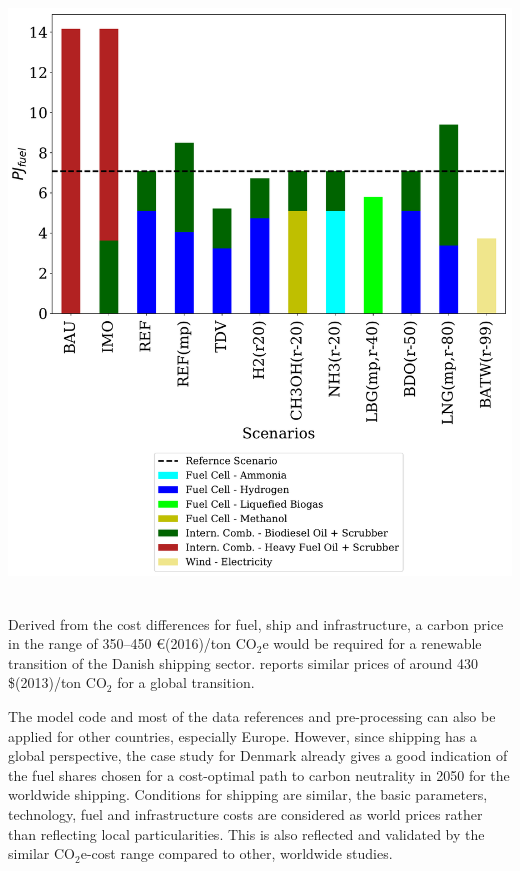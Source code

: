 \documentclass[article]{elsarticle}
\begin{document}
\begin{minipage}[t]{0.49\textwidth}
    \centering
    \captionsetup{justification=centering}
    \includegraphics[width=.95\textwidth]{figures/AllFuel2050.pdf}
    \label{fig:AllFuel2050}
\end{minipage}\\[0.75cm]



Derived from the cost differences for fuel, ship and infrastructure, a carbon price in the range of 350--450 \euro(2016)/ton CO$_2$e would be required for a renewable transition of the Danish shipping sector. \citep[p.197]{Raucci2017} reports similar prices of around 430 \$(2013)/ton CO$_2$ for a global transition.

The model code and most of the data references and pre-processing can also be applied for other countries, especially Europe. However, since shipping has a global perspective, the case study for Denmark already gives a good indication of the fuel shares chosen for a cost-optimal path to carbon neutrality in 2050 for the worldwide shipping. Conditions for shipping are similar, the basic parameters, technology, fuel and infrastructure costs are considered as world prices rather than reflecting local particularities. This is also reflected and validated by the similar CO$_2$e-cost range compared to other, worldwide studies. 
\end{document}
